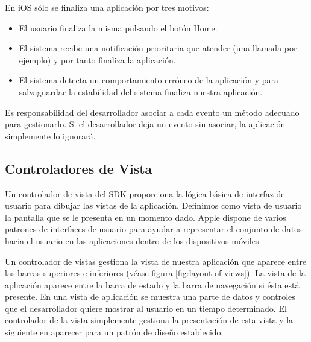     En iOS sólo se finaliza una aplicación por tres motivos:
    \begin{itemize}
	\item El usuario finaliza la misma pulsando el botón \textsf{Home}. %
	\item El sistema recibe una notificación prioritaria que atender (una llamada por ejemplo) y por tanto finaliza la aplicación. %
	\item El sistema detecta un comportamiento erróneo de la aplicación y para salvaguardar la estabilidad del sistema finaliza nuestra aplicación.
     \end{itemize}

    Es responsabilidad del desarrollador asociar a cada evento un método adecuado para gestionarlo. Si el desarrollador deja un evento sin asociar, la aplicación simplemente lo ignorará.
    
    
\subsection{Controladores de Vista}	   

 
 Un controlador de vista del SDK proporciona la lógica básica de interfaz de usuario para dibujar las vistas de la aplicación. Definimos como vista de usuario la pantalla que se le presenta en un momento dado. Apple dispone de varios patrones de interfaces de usuario para ayudar a representar el conjunto de datos hacia el usuario en las aplicaciones dentro de los dispositivos móviles. 
 
  Un controlador de vistas gestiona la vista de nuestra aplicación que aparece entre las barras superiores e inferiores (véase figura \ref{fig:layout-of-views}).%
  La vista de la aplicación aparece entre la barra de estado y la barra de navegación si ésta está presente. En una vista de aplicación se muestra una parte de datos y controles que el desarrollador quiere mostrar al usuario en un tiempo determinado. El controlador de la vista simplemente gestiona la presentación de esta vista y la siguiente en aparecer para un patrón de diseño establecido.
 

